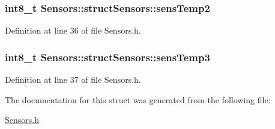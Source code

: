 \subsubsection[{\texorpdfstring{sens\+Temp2}{sensTemp2}}]{\setlength{\rightskip}{0pt plus 5cm}int8\+\_\+t Sensors\+::struct\+Sensors\+::sens\+Temp2}\hypertarget{struct_sensors_1_1struct_sensors_a5b3086768c0be51c00c8bf8f3df4c9a8}{}\label{struct_sensors_1_1struct_sensors_a5b3086768c0be51c00c8bf8f3df4c9a8}


Definition at line 36 of file Sensors.\+h.

\subsubsection[{\texorpdfstring{sens\+Temp3}{sensTemp3}}]{\setlength{\rightskip}{0pt plus 5cm}int8\+\_\+t Sensors\+::struct\+Sensors\+::sens\+Temp3}\hypertarget{struct_sensors_1_1struct_sensors_aa3f563131986d4d3551e6889dd7b4b3b}{}\label{struct_sensors_1_1struct_sensors_aa3f563131986d4d3551e6889dd7b4b3b}


Definition at line 37 of file Sensors.\+h.



The documentation for this struct was generated from the following file\+:\begin{DoxyCompactItemize}
\item 
\hyperlink{_sensors_8h}{Sensors.\+h}\end{DoxyCompactItemize}
